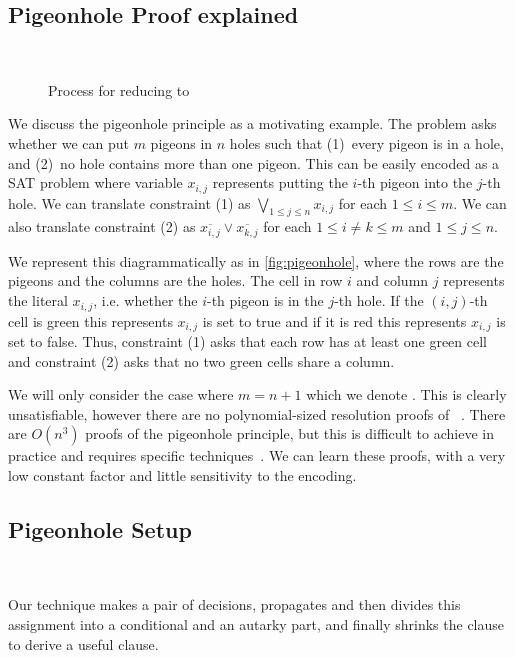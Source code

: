 \subsection{Pigeonhole Proof explained}~\label{app:pigeonhole}

\begin{figure*}[!t]
    \centering
    
    \caption{Process for reducing  to }
  \end{figure*}

We discuss the pigeonhole principle as a motivating example. The problem asks 
whether we can put $m$ pigeons in $n$ holes such that (1)~every pigeon is in a 
hole, and (2)~no hole contains more than one pigeon. This can be easily 
encoded as a SAT problem where variable $x_{i, j}$ represents putting the 
$i$-th pigeon into the $j$-th hole. We can translate constraint (1) as $\bigvee_{1 \leq j \leq n} x_{i, j}$ for each $1 \leq i \leq m$. We can also translate constraint (2) as $\overline{x_{i, j}} \lor \overline{x_{k, j}}$ for each $ 1 \leq i \neq k \leq m$ and $1 \leq j \leq n$.

We represent this diagrammatically as in \autoref{fig:pigeonhole}, where the rows are the pigeons and the columns are the holes. The cell in row $i$ and column $j$ represents the literal $x_{i, j}$, i.e. whether the $i$-th pigeon is in the $j$-th hole. If the $(i, j)$-th cell is green this represents $x_{i, j}$ is set to true and if it is red this represents $x_{i, j}$ is set to false. Thus, constraint (1) asks that each row has at least one green cell and constraint (2) asks that no two green cells share a column.

We will only consider the case where $m = n + 1$ which we denote . This is clearly unsatisfiable, however there are no polynomial-sized resolution proofs of ~\cite{hakenpigeonhole}. There are $O(n^3)$ \pr proofs of the pigeonhole principle, but this is difficult to achieve in practice and requires specific techniques~\cite{prclauses}. We can learn these proofs, with a very low constant factor and little sensitivity to the encoding.


\subsection{Pigeonhole Setup}~\label{subsec:pigeonhole-setup}

Our technique makes a pair of decisions, propagates and then divides this assignment into a conditional and an autarky part, and finally shrinks the clause to derive a useful \pr clause.


